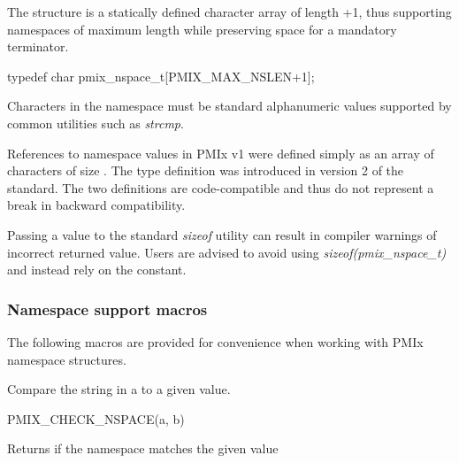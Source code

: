 The  structure is a statically defined character array of length +1, thus supporting namespaces of maximum length  while preserving space for a mandatory  terminator.

\cspecificstart
\begin{codepar}
typedef char pmix_nspace_t[PMIX_MAX_NSLEN+1];
\end{codepar}
\cspecificend

Characters in the namespace must be standard alphanumeric values supported by common utilities such as \textit{strcmp}.

\adviceuserstart
References to namespace values in \ac{PMIx} v1 were defined simply as an array of characters of size . The  type definition was introduced in version 2 of the standard. The two definitions are code-compatible and thus do not represent a break in backward compatibility.

Passing a  value to the standard \textit{sizeof} utility can result in compiler warnings of incorrect returned value. Users are advised to avoid using \textit{sizeof(pmix_nspace_t)} and instead rely on the  constant.
\adviceuserend

\subsubsection{Namespace support macros}

The following macros are provided for convenience when working with \ac{PMIx} namespace structures.


Compare the string in a  to a given value.

\cspecificstart
\begin{codepar}
PMIX_CHECK_NSPACE(a, b)
\end{codepar}
\cspecificend

\begin{arglist}
\end{arglist}

Returns  if the namespace matches the given value

